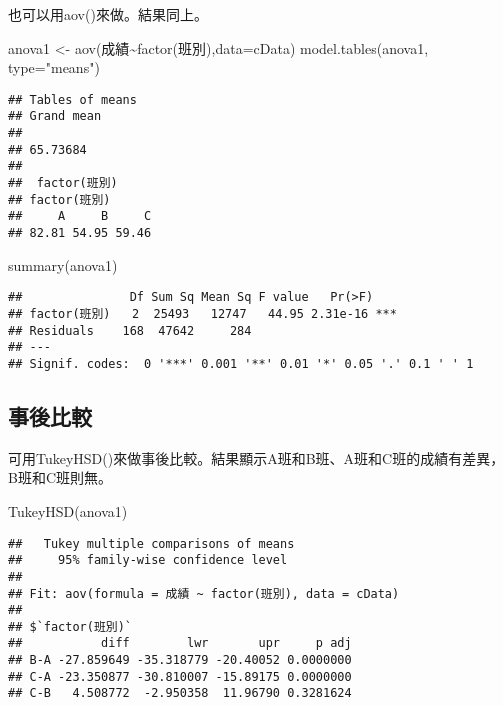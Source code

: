 \documentclass[
]{book}
\newenvironment{Shaded}{\begin{snugshade}}{\end{snugshade}}
\newcommand{\AttributeTok}[1]{\textcolor[rgb]{0.77,0.63,0.00}{#1}}
\newcommand{\FunctionTok}[1]{\textcolor[rgb]{0.00,0.00,0.00}{#1}}
\newcommand{\NormalTok}[1]{#1}
\newcommand{\OtherTok}[1]{\textcolor[rgb]{0.56,0.35,0.01}{#1}}
\newcommand{\SpecialCharTok}[1]{\textcolor[rgb]{0.00,0.00,0.00}{#1}}
\newcommand{\StringTok}[1]{\textcolor[rgb]{0.31,0.60,0.02}{#1}}
\begin{document}
也可以用aov()來做。結果同上。

\begin{Shaded}
\begin{Highlighting}[]
\NormalTok{anova1 }\OtherTok{\textless{}{-}} \FunctionTok{aov}\NormalTok{(成績}\SpecialCharTok{\textasciitilde{}}\FunctionTok{factor}\NormalTok{(班別),}\AttributeTok{data=}\NormalTok{cData)}
\FunctionTok{model.tables}\NormalTok{(anova1, }\AttributeTok{type=}\StringTok{"means"}\NormalTok{)}
\end{Highlighting}
\end{Shaded}

\begin{verbatim}
## Tables of means
## Grand mean
##          
## 65.73684 
## 
##  factor(班別) 
## factor(班別)
##     A     B     C 
## 82.81 54.95 59.46
\end{verbatim}

\begin{Shaded}
\begin{Highlighting}[]
\FunctionTok{summary}\NormalTok{(anova1)}
\end{Highlighting}
\end{Shaded}

\begin{verbatim}
##               Df Sum Sq Mean Sq F value   Pr(>F)    
## factor(班別)   2  25493   12747   44.95 2.31e-16 ***
## Residuals    168  47642     284                     
## ---
## Signif. codes:  0 '***' 0.001 '**' 0.01 '*' 0.05 '.' 0.1 ' ' 1
\end{verbatim}

\hypertarget{ux4e8bux5f8cux6bd4ux8f03}{%
\subsection{事後比較}\label{ux4e8bux5f8cux6bd4ux8f03}}

可用TukeyHSD()來做事後比較。結果顯示A班和B班、A班和C班的成績有差異，B班和C班則無。

\begin{Shaded}
\begin{Highlighting}[]
\FunctionTok{TukeyHSD}\NormalTok{(anova1)}
\end{Highlighting}
\end{Shaded}

\begin{verbatim}
##   Tukey multiple comparisons of means
##     95% family-wise confidence level
## 
## Fit: aov(formula = 成績 ~ factor(班別), data = cData)
## 
## $`factor(班別)`
##           diff        lwr       upr     p adj
## B-A -27.859649 -35.318779 -20.40052 0.0000000
## C-A -23.350877 -30.810007 -15.89175 0.0000000
## C-B   4.508772  -2.950358  11.96790 0.3281624
\end{verbatim}
\end{document}
